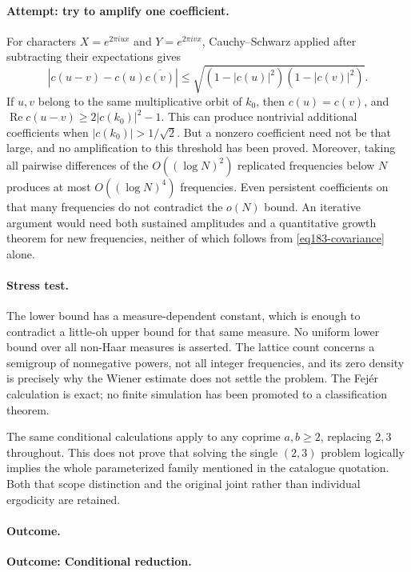 \documentclass[11pt,a4paper]{article}
\numberwithin{equation}{section}
\begin{document}
\paragraph{Attempt: try to amplify one coefficient.}
For characters $X=e^{2\pi iux}$ and $Y=e^{2\pi ivx}$, Cauchy--Schwarz
applied after subtracting their expectations gives
\begin{equation}\label{eq183-covariance}
 |c(u-v)-c(u)\overline{c(v)}|
          \le\sqrt{(1-|c(u)|^2)(1-|c(v)|^2)}.
\end{equation}
If $u,v$ belong to the same multiplicative orbit of $k_0$, then
$c(u)=c(v)$, and
$\operatorname{Re}c(u-v)\ge2|c(k_0)|^2-1$.
This can produce nontrivial additional coefficients when
$|c(k_0)|>1/\sqrt2$. But a nonzero coefficient need not be that large,
and no amplification to this threshold has been proved. Moreover, taking
all pairwise differences of the $O((\log N)^2)$ replicated frequencies
below $N$ produces at most $O((\log N)^4)$ frequencies. Even persistent
coefficients on that many frequencies do not contradict the $o(N)$ bound.
An iterative argument would need both sustained amplitudes and a
quantitative growth theorem for new frequencies, neither of which follows
from \eqref{eq183-covariance} alone.

\paragraph{Stress test.}
The lower bound has a measure-dependent constant, which is enough to
contradict a little-oh upper bound for that same measure. No uniform lower
bound over all non-Haar measures is asserted. The lattice count concerns
a semigroup of nonnegative powers, not all integer frequencies, and its
zero density is precisely why the Wiener estimate does not settle the
problem. The Fej\'er calculation is exact; no finite simulation has been
promoted to a classification theorem.

The same conditional calculations apply to any coprime $a,b\ge2$, replacing
$2,3$ throughout. This does not prove that solving the single $(2,3)$
problem logically implies the whole parameterized family mentioned in the
catalogue quotation. Both that scope distinction and the original joint
rather than individual ergodicity are retained.

\paragraph{Outcome.}
\textbf{Outcome: Conditional reduction.}
\end{document}
